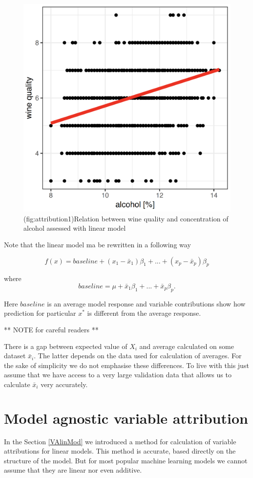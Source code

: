 \documentclass[]{book}
\theoremstyle{definition}
\theoremstyle{definition}
\theoremstyle{definition}
\theoremstyle{remark}
\begin{document}
\begin{figure}

{\centering \includegraphics[width=0.5\linewidth]{figure/attribution_1} 

}

\caption{(fig:attribution1)Relation between wine quality and concentration of alcohol assessed with linear model}\label{fig:attribution1}
\end{figure}

Note that the linear model ma be rewritten in a following way

\[
f(x) = baseline + (x_1 - \bar x_1) \beta_1 + ... + (x_p - \bar x_p) \beta_p
\]

where \[
baseline = \mu + \bar x_1 \beta_1 + ... + \bar x_p \beta_p.
\]

Here \(baseline\) is an average model response and variable
contributions show how prediction for particular \(x^*\) is different
from the average response.

** NOTE for careful readers **

There is a gap between expected value of \(X_i\) and average calculated
on some dataset \(\bar x_i\). The latter depends on the data used for
calculation of averages. For the sake of simplicity we do not emphasise
these differences. To live with this just assume that we have access to
a very large validation data that allows us to calculate \(\bar x_i\)
very accurately.

\hypertarget{modelAgnosticAttribution}{%
\section{Model agnostic variable
attribution}\label{modelAgnosticAttribution}}

In the Section \ref{VAlinMod} we introduced a method for calculation of
variable attributions for linear models. This method is accurate, based
directly on the structure of the model. But for most popular machine
learning models we cannot assume that they are linear nor even additive.
\end{document}
